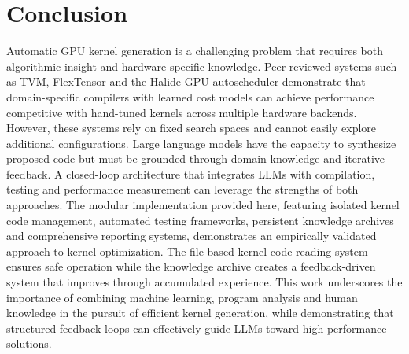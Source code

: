 \documentclass{article}
\begin{document}
\section {Conclusion}
Automatic GPU kernel generation is a challenging problem that requires both algorithmic insight and hardware-specific knowledge. Peer-reviewed systems such as TVM, FlexTensor and the Halide GPU autoscheduler demonstrate that domain-specific compilers with learned cost models can achieve performance competitive with hand-tuned kernels across multiple hardware backends. However, these systems rely on fixed search spaces and cannot easily explore additional configurations. Large language models have the capacity to synthesize proposed code but must be grounded through domain knowledge and iterative feedback. A closed-loop architecture that integrates LLMs with compilation, testing and performance measurement can leverage the strengths of both approaches. The modular implementation provided here, featuring isolated kernel code management, automated testing frameworks, persistent knowledge archives and comprehensive reporting systems, demonstrates an empirically validated approach to kernel optimization. The file-based kernel code reading system ensures safe operation while the knowledge archive creates a feedback-driven system that improves through accumulated experience. This work underscores the importance of combining machine learning, program analysis and human knowledge in the pursuit of efficient kernel generation, while demonstrating that structured feedback loops can effectively guide LLMs toward high-performance solutions.
\end{document}
